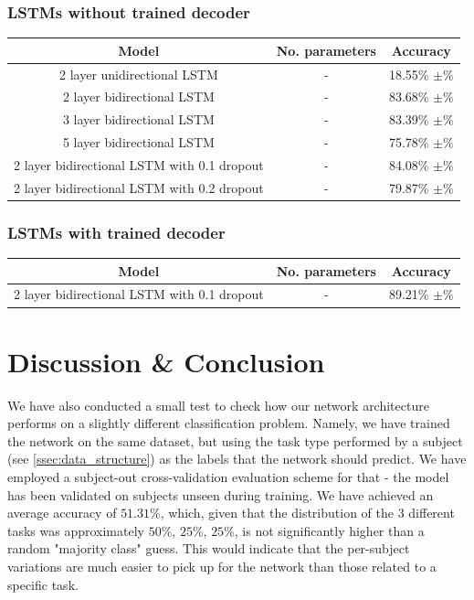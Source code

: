 \documentclass{article}
\begin{document}
\subsubsection{LSTMs without trained decoder}
\begin{center}
\begin{tabular}{ c|c|c } 
 Model & No. parameters & Accuracy \\ 
 \hline
 2 layer unidirectional LSTM & - & 18.55\% $\pm \% $\\ 
 2 layer bidirectional LSTM & - & 83.68\% $\pm \%$ \\ 
 3 layer bidirectional LSTM & - & 83.39\% $\pm \%$ \\ 
 5 layer bidirectional LSTM & - & 75.78\% $\pm \%$ \\
 2 layer bidirectional LSTM with 0.1 dropout & - & 84.08\% $\pm \%$ \\
 2 layer bidirectional LSTM with 0.2 dropout & - & 79.87\% $\pm \%$ \\
\end{tabular}
\end{center}
\subsubsection{LSTMs with trained decoder}
\begin{center}
\begin{tabular}{ c|c|c } 
 Model & No. parameters & Accuracy \\ 
 \hline
 2 layer bidirectional LSTM with 0.1 dropout & - & 89.21\% $\pm \%$ \\
\end{tabular}
\end{center}

\section{Discussion \& Conclusion}
We have also conducted a small test to check how our network architecture performs on a slightly different classification problem. Namely, we have trained the network on the same dataset, but using the task type performed by a subject (see \ref{ssec:data_structure}) as the labels that the network should predict. We have employed a subject-out cross-validation evaluation scheme for that - the model has been validated on subjects unseen during training. We have achieved an average accuracy of $51.31\%$, which, given that the distribution of the 3 different tasks was approximately $50\%$, $25\%$, $25\%$, is not significantly higher than a random "majority class" guess. This would indicate that the per-subject variations are much easier to pick up for the network than those related to a specific task.
\end{document}
